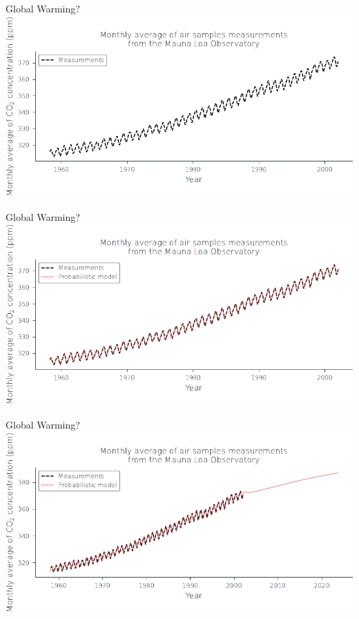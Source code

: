 \documentclass[handout]{beamer}
\begin{document}
\begin{frame}{Global Warming?}
    \includegraphics[width=\textwidth]{../figures/introduction/co2_data.pdf}    
    
\end{frame}

\begin{frame}{Global Warming?}
    \includegraphics[width=\textwidth]{../figures/introduction/train_fit.pdf}    
    
\end{frame}

\begin{frame}{Global Warming?}
    \includegraphics[width=\textwidth]{../figures/introduction/future_mean.pdf}    
    
\end{frame}
\end{document}
